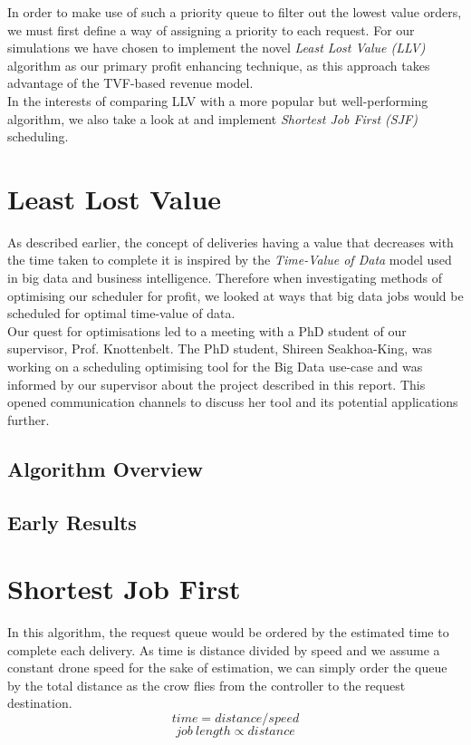 \documentclass[a4paper,11pt,titlepage]{report}
\begin{document}
In order to make use of such a priority queue to filter out the lowest value orders, we must first define a way of assigning a priority to each request. For our simulations we have chosen to implement the novel \textit{Least Lost Value (LLV)} algorithm as our primary profit enhancing technique, as this approach takes advantage of the TVF-based revenue model.\\

In the interests of comparing LLV with a more popular but well-performing algorithm, we also take a look at and implement \textit{Shortest Job First (SJF)} scheduling.

\section{Least Lost Value}
As described earlier, the concept of deliveries having a value that decreases with the time taken to complete it is inspired by the \textit{Time-Value of Data} model used in big data and business intelligence. Therefore when investigating methods of optimising our scheduler for profit, we looked at ways that big data jobs would be scheduled for optimal time-value of data.\\

Our quest for optimisations led to a meeting with a PhD student of our supervisor, Prof. Knottenbelt. The PhD student, Shireen Seakhoa-King, was working on a scheduling optimising tool for the Big Data use-case and was informed by our supervisor about the project described in this report. This opened communication channels to discuss her tool and its potential applications further.\\

\subsection{Algorithm Overview}

\subsection{Early Results}


\section{Shortest Job First}
In this algorithm, the request queue would be ordered by the estimated time to complete each delivery. As time is distance divided by speed and we assume a constant drone speed for the sake of estimation, we can simply order the queue by the total distance as the crow flies from the controller to the request destination.
$$ time = distance / speed $$
$$ job\ length \propto distance $$
\end{document}
